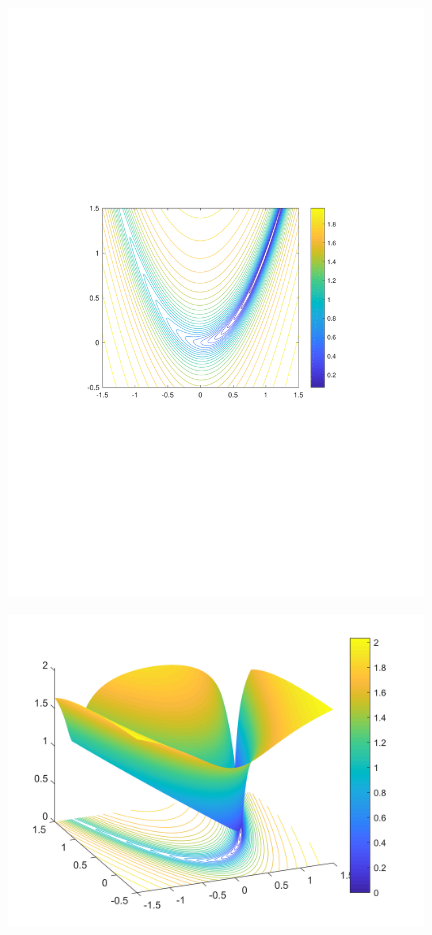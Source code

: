 \begin{figure}[H]
\centering
\includegraphics[width=11cm]{fig/4_01.pdf}
\end{figure}


\begin{figure}[H]
\centering
\includegraphics[width=11cm]{fig/4_02.png}
\end{figure}


